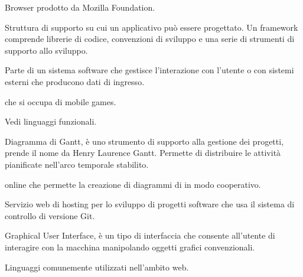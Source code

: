 \begin{itemize}


Browser  prodotto da Mozilla Foundation.


Struttura di supporto su cui un applicativo può essere progettato.
Un framework comprende librerie di codice, convenzioni di sviluppo e una serie di strumenti di supporto allo sviluppo.


Parte di un sistema software che gestisce l'interazione con l'utente o con sistemi esterni che producono dati di ingresso.


 che si occupa di mobile games.


Vedi linguaggi funzionali.

\end{itemize}


\begin{itemize}


Diagramma di Gantt, è uno strumento di supporto alla gestione dei progetti, prende il nome da Henry Laurence Gantt.
Permette di distribuire le attività pianificate nell'arco temporale stabilito.


 online che permette la creazione di diagrammi di  in modo cooperativo.


Servizio web di hosting per lo sviluppo di progetti software che usa il sistema di controllo di versione Git.


Graphical User Interface, è un tipo di interfaccia che consente all'utente di interagire con la macchina manipolando oggetti grafici convenzionali.

\end{itemize}


\begin{itemize}


Linguaggi comunemente utilizzati nell'ambito web.

\end{itemize}


